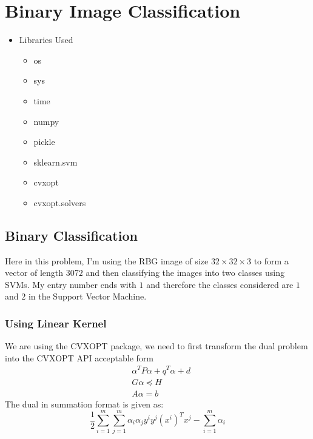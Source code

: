 \documentclass[11pt]{article}
\begin{document}
\section{ Binary Image Classification}
\begin{itemize}
    \item \large Libraries Used
    \begin{itemize}
        \item[\ding{227}] os
        \item[\ding{227}] sys
        \item[\ding{227}] time
        \item[\ding{227}] numpy
        \item[\ding{227}] pickle
        \item[\ding{227}] sklearn.svm
        \item[\ding{227}] cvxopt
        \item[\ding{227}] cvxopt.solvers
    \end{itemize}
\end{itemize}
\subsection{Binary Classification}
Here in this problem, I'm using the RBG image of size $32 \times 32 \times 3$ to form a vector of length $3072$ and then classifying the images into two classes using SVMs. My entry number ends with $1$ and therefore the classes considered are $1$ and $2$ in the Support Vector Machine.

\subsubsection{Using Linear Kernel}
We are using the CVXOPT package, we need to first transform the dual problem into the CVXOPT API acceptable form
\begin{equation}
  \begin{split}
    &\alpha^T P \alpha + q^T \alpha + d\\
    &G \alpha \preceq H\\
    &A \alpha = b
  \end{split}
\end{equation}
The dual in summation format is given as:
\begin{equation}
  \frac{1}{2}\sum_{i=1}^m\sum_{j=1}^m \alpha_i \alpha_j y^i y^j (x^i)^T x^j - \sum_{i=1}^m \alpha_i
\end{equation}
\end{document}

